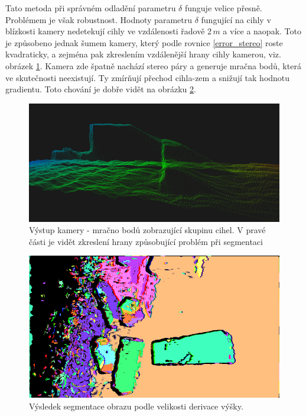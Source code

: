 \documentclass[twoside]{ctuthesis}
\begin{document}
Tato metoda při správném odladění parametru $\delta$ funguje velice přesně. Problémem je však robustnost. Hodnoty parametru $\delta$ fungující na cihly v blízkosti kamery nedetekují cihly ve vzdálenosti řadově 2\,$m$ a více a naopak. Toto je způsobeno jednak šumem kamery, který podle rovnice \ref{error_stereo} roste kvadraticky, a zejména pak zkreslením vzdálenější hrany cihly kamerou, viz. obrázek \ref{fig:point_cloud_grad}. Kamera zde špatně nachází stereo páry a generuje mračna bodů, která ve skutečnosti neexistují. Ty zmírňují přechod cihla-zem a snižují tak hodnotu gradientu. Toto chování je dobře vidět na obrázku \ref{fig:sobel_segment}.
\begin{figure}
    \centering
    \includegraphics[width = \linewidth]{pictures/pc_crop.png}
    \caption{Výstup kamery - mračno bodů zobrazující skupinu cihel. V pravé části je vidět zkreslení hrany způsobující problém při segmentaci}
    \label{fig:point_cloud_grad}
\end{figure}

\begin{figure}
    \centering
    \includegraphics[width = \linewidth]{pictures/obr10_grad.png}
    \caption{Výsledek segmentace obrazu podle velikosti derivace výšky.}
    \label{fig:sobel_segment}
\end{figure}
\end{document}
